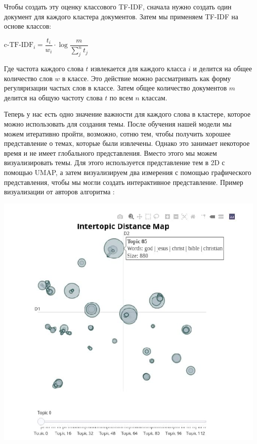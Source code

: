 Чтобы создать эту оценку классового TF-IDF, сначала нужно создать один документ для каждого кластера документов.
Затем мы применяем TF-IDF на основе классов:

\begin{center}
$\text{c-TF-IDF}_{i} = 
\dfrac{t_i}{w_i} \cdot 
\log{
\dfrac{m}{\sum\limits_j^n t_j}}$
\end{center}

Где частота каждого слова $t$ извлекается для каждого класса $i$ и делится на общее количество слов $w$ в классе. Это действие можно рассматривать как форму регуляризации частых слов в классе. Затем общее количество документов $m$ делится на общую частоту слова $t$ по всем $n$ классам.

Теперь у нас есть одно значение важности для каждого слова в кластере, которое можно использовать для создания темы. После обучения нашей модели мы можем итеративно пройти, возможно, сотню тем, чтобы получить хорошее представление о темах, которые были извлечены. Однако это занимает некоторое время и не имеет глобального представления. Вместо этого мы можем визуализировать темы. Для этого используется представление тем в 2D с помощью UMAP, а затем визуализируем два измерения с помощью графического представления, чтобы мы могли создать интерактивное представление. Пример визуализации от авторов алгоритма \cite{bib_4}:

\begin{center}
\includegraphics[scale=0.9]{pics/bertopic-visual-1.jpg}
\end{center}

